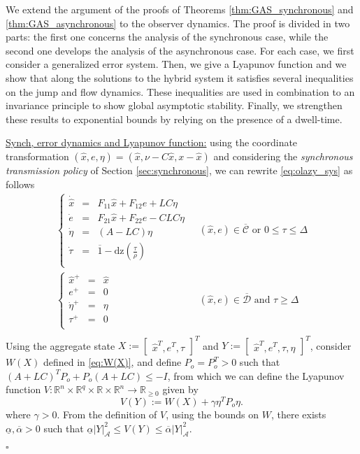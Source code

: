 \documentclass[twocolumn]{autart}
\newenvironment{proofof}{\noindent {\em Proof of }}{\hfill \hspace*{1pt}
\hfill $\square$}
\newcommand{\realn}{\real^n}
\newcommand\real{\ensuremath{{\mathbb R}}}
\newcommand{\smallmat}[1]{\left[ \begin{smallmatrix}#1
    \end{smallmatrix} \right]}
\newcommand\dz{\mathrm{dz}}
\begin{document}
\begin{proofof}{\emph{Theorem \ref{thm:GASoutput}}.}
{
We extend the argument of the proofs of Theorems \ref{thm:GAS_synchronous} 
and \ref{thm:GAS_asynchronous} to the observer dynamics. The proof is 
divided in two parts: the first one concerns the analysis of the synchronous case,
while the second one develops the analysis of the asynchronous case. 
For each case, we first
consider a generalized error system. Then, we give a Lyapunov function and we
show that along the solutions to the hybrid system it satisfies several 
inequalities on the jump and flow dynamics. These
inequalities are used in combination to an invariance principle to show
global asymptotic stability. Finally, we strengthen these results to 
exponential bounds by relying on the presence of a dwell-time.}


{ \underline{Synch, error dynamics and Lyapunov function:}} 
using the coordinate transformation 
 $(\hat{x},e,\eta) = (\hat{x},\nu-C\hat{x},x-\hat{x})$ and 
 considering the \emph{synchronous transmission policy} of Section \ref{sec:synchronous},
 we can rewrite \eqref{eq:olazy_sys} as follows 
\begin{equation}
\label{eq:olazy_sys_synch}
  \begin{array}{ll} 
	\left\{ \begin{array}{lll}
		\dot{\hat{x}} &=& F_{11}\hat{x} + F_{12}e + LC\eta\\
		\dot{e} &=& F_{21}\hat{x} + F_{22}e -CLC\eta \\
		\dot{\eta} &=& (A-LC)\eta \\
		\dot{\tau} &=& \overline{1}-\dz(\frac{\tau}{\rho} ) \\
	 \end{array}\right. & 
	\;(\hat{x},e)\!\in\! \overline{\mathcal{C}} \mbox{ or }   0 \!\leq\! \tau \!\leq\! \Delta \\
	\left\{\begin{array}{lll}
		\hat{x}^+ &=& \hat{x} \\
		e^+ &=& 0 \\
		\dot{\eta}^+ &=& \eta\\
		\tau^+ &=& 0 \\
	\end{array} \right. & 
	\;(\hat{x},e)\!\in\! \overline{\mathcal{D}} \mbox{ and }  \tau \!\geq\! \Delta \\
 \end{array}
\end{equation}
Using the aggregate state $X:= \smallmat{\hat{x}^T, e^T, \tau}^T$ and 
$Y:= \smallmat{\hat{x}^T, e^T, \tau, \eta}^T$, 
consider $W(X)$ defined in \eqref{eq:W(X)},
and define $P_o=P_o^T>0$ such that $(A+LC)^TP_o + P_o(A+LC) \leq -I$, from which we can define the 
Lyapunov function $V:\realn\times\real^q\times\real\times \realn \to \real_{\geq 0}$ given by 
\begin{equation}
\label{eq:proofthm3_0}
 V(Y) := W(X) + \gamma \eta^T P_o \eta. 
\end{equation}
where $\gamma>0$.
From the definition of $V$, using the bounds on $W$, 
there exists $\underline{\alpha},\overline{\alpha}>0$ such that 
$\underline{\alpha}|Y|^2_\mathcal{A} \leq V(Y) \leq \overline{\alpha}|Y|^2_\mathcal{A}$. 


\end{proofof}
\end{document}
